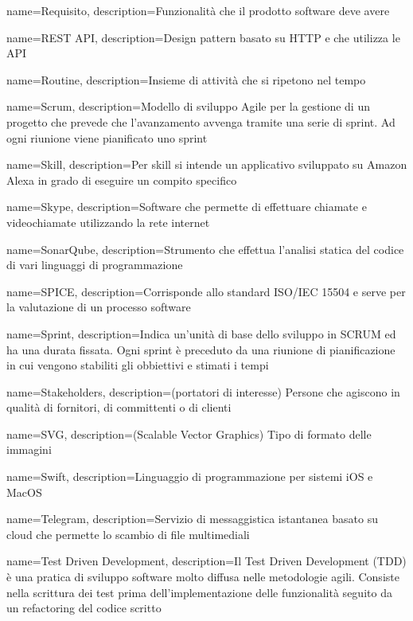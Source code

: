 {
	name={Requisito},
	description={Funzionalità che il prodotto software deve avere}
}

{
	name={REST API},
	description={Design pattern basato su HTTP e che utilizza le API}
}

{
	name={Routine},
	description={Insieme di attività che si ripetono nel tempo}
}

{
	name={Scrum},
	description={Modello di sviluppo Agile per la gestione di un progetto che prevede che l’avanzamento avvenga tramite una serie di sprint. Ad ogni riunione viene pianificato uno sprint}
}

{
	name={Skill},
	description={Per skill si intende un applicativo sviluppato su Amazon Alexa in grado di eseguire un compito specifico}
}

{
	name={Skype},
	description={Software che permette di effettuare chiamate e videochiamate utilizzando la rete internet}
}

{
	name={SonarQube},
	description={Strumento che effettua l’analisi statica del codice di vari linguaggi di programmazione}
}

{
	name={SPICE},
	description={Corrisponde allo standard ISO/IEC 15504 e serve per la valutazione di un processo software}
}

{
	name={Sprint},
	description={Indica un’unità di base dello sviluppo in SCRUM ed ha una durata fissata. Ogni sprint è preceduto da una riunione di pianificazione in cui vengono stabiliti gli obbiettivi e stimati i tempi}
}

{
	name={Stakeholders},
	description={(portatori di interesse) Persone che agiscono in qualità di fornitori, di committenti o di clienti}
}

{
	name={SVG},
	description={(Scalable Vector Graphics) Tipo di formato delle immagini}
}

{
	name={Swift},
	description={Linguaggio di programmazione per sistemi iOS e MacOS}
}

{
	name={Telegram},
	description={Servizio di messaggistica istantanea basato su cloud che permette lo scambio di file multimediali}
}

{
	name={Test Driven Development},
	description={Il Test Driven Development (TDD) è una pratica di sviluppo software molto diffusa nelle metodologie agili.
		Consiste nella scrittura dei test prima dell'implementazione delle funzionalità seguito da un refactoring del codice scritto}
}

